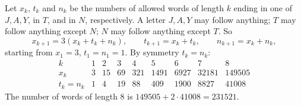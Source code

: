 Let $x_k$, $t_k$ and $n_k$ be the numbers of allowed words of length $k$ ending in one of $J,A,Y$, in $T$, and in $N$, respectively. A letter $J,A,Y$ may follow anything; $T$ may follow anything except $N$; $N$ may follow anything except $T$. So
\[x_{k+1}=3(x_k+t_k+n_k),\qquad t_{k+1}=x_k+t_k,\qquad n_{k+1}=x_k+n_k,\]
starting from $x_1=3$, $t_1=n_1=1$. By symmetry $t_k=n_k$:
\[\begin{array}{c|cccccccc}k&1&2&3&4&5&6&7&8\\ \hline x_k&3&15&69&321&1491&6927&32181&149505\\ t_k=n_k&1&4&19&88&409&1900&8827&41008\end{array}\]
The number of words of length $8$ is $149505+2\cdot41008=\boxed{231521}$.
